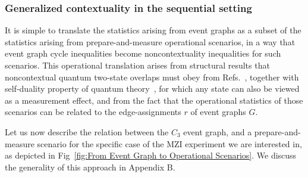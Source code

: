 \documentclass[a4paper,twocolumn,11pt,accepted=2024-01-17]{quantumarticle}
\begin{document}
\subsubsection{Generalized contextuality in the sequential setting}\label{subsubsec: gen contextuality in sequential}

It is simple to translate the statistics arising from event graphs as a subset of the statistics arising from prepare-and-measure operational scenarios, in a way that event graph cycle inequalities become noncontextuality inequalities for such scenarios. This operational translation arises from structural results that noncontextual quantum two-state overlaps must obey from Refs.~\cite{Lostaglio2020contextualadvantage,schmid2018discrimination}, together with self-duality property of quantum theory~\cite{janotta2013generalized,muller2012structure}, for which any state can also be viewed as a measurement effect, and from the fact that the operational statistics of those scenarios can be related to the edge-assignments $r$ of event graphs $G$. 

Let us now describe the relation between the $C_3$ event graph, and a prepare-and-measure scenario for the specific case of the MZI experiment we are interested in, as depicted in Fig~\ref{fig:From Event Graph to Operational Scenarios}. We discuss the generality of this approach in Appendix B. 

\end{document}
